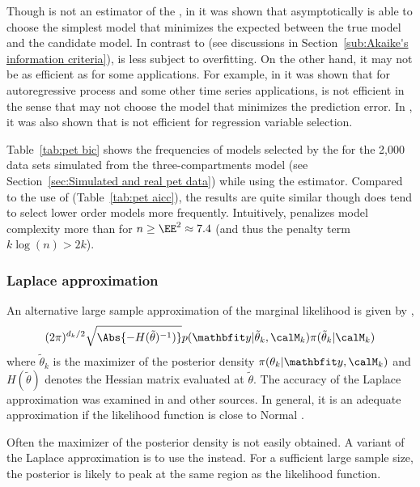 Though \bic is not an estimator of the \kldfull, in \cite{Sin:1996vs} it was
shown that asymptotically \bic is able to choose the simplest model that
minimizes the expected \kld between the true model and the candidate model.
In contrast to \aic (see discussions in Section~\ref{sub:Akaike's information
criteria}), \bic is less subject to overfitting. On the other hand, it may
not be as efficient as \aic for some applications. For example, in
\cite{Lee:2001tm} it was shown that for autoregressive process and some other
time series applications, \bic is not efficient in the sense that \bic may
not choose the model that minimizes the prediction error. In
\cite[][sec.~4.7]{Claeskens:2008tq}, it was also shown that \bic is not
efficient for regression variable selection.

Table~\ref{tab:pet bic} shows the frequencies of models selected by the \bic
for the 2,000 \pet data sets simulated from the three-compartments model (see
Section~\ref{sec:Simulated and real pet data}) while using the \nls
estimator. Compared to the use of \aicc (Table~\ref{tab:pet aicc}), the
results are quite similar though \bic does tend to select lower order models
more frequently. Intuitively, \bic penalizes model complexity more than \aic
for $n\ge\EE^2\approx7.4$ (and thus the penalty term $k\log(n) > 2k$).



\subsubsection{Laplace approximation}
\label{ssub:Laplace approximation}

An alternative large sample approximation of the marginal likelihood is given
by \cite{Tierney:1986vx},
\begin{equation}
  (2\pi)^{d_k/2}\sqrt{\Abs{-H(\tilde\theta)^{-1})}}
  p(\data|\tilde\theta_k,\calM_k)\pi(\tilde\theta_k|\calM_k)
\end{equation}
where $\tilde\theta_k$ is the maximizer of the posterior density
$\pi(\theta_k|\data,\calM_k)$ and $H(\tilde\theta)$ denotes the Hessian
matrix evaluated at $\tilde\theta$. The accuracy of the Laplace approximation
was examined in \cite{Kass:1992tz} and other sources. In general, it is an
adequate approximation if the likelihood function is close to Normal
\cite{Kass:1995vb}.

Often the maximizer of the posterior density is not easily obtained. A
variant of the Laplace approximation is to use the \mle instead. For a
sufficient large sample size, the posterior is likely to peak at the same
region as the likelihood function.

